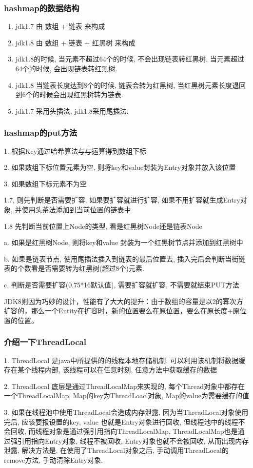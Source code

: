 \subsubsection{hashmap的数据结构}
\begin{enumerate}
	\item jdk1.7 由 数组 + 链表  来构成
	\item jdk1.8 由 数组 + 链表 + 红黑树 来构成
	\item jdk1.8的时候, 当元素不超过64个的时候, 不会出现链表转红黑树, 当元素超过64个的时候, 会出现链表转红黑树.
	\item jdk1.8 当链表长度达到8个的时候, 链表会转为红黑树, 当红黑树元素长度退回到6个的时候会出现红黑树转为链表.
	\item jdk1.7 采用头插法, jdk1.8采用尾插法.
\end{enumerate}
\subsubsection{hashmap的put方法}
1. 根据Key通过哈希算法与与运算得到数组下标 \par
2. 如果数组下标位置元素为空, 则将key和value封装为Entry对象并放入该位置 \par
3. 如果数组下标元素不为空 \par
1.7, 则先判断是否需要扩容, 如果要扩容就进行扩容, 如果不用扩容就生成Entry对象, 并使用头茶法添加到当前位置的链表中 \par
1.8 先判断当前位置上Node的类型, 看是红黑树Node还是链表Node \par
a. 如果是红黑树Node, 则将key和value 封装为一个红黑树节点并添加到红黑树中 \par
b. 如果是链表节点, 使用尾插法插入到链表的最后位置去, 插入完后会判断当街链表的个数看是否需要转为红黑树(超过8个)元素. \par
c. 判断是否需要扩容(0.75*16默认值), 需要扩容就扩容, 不需要就结束PUT方法 \par

JDK8则因为巧妙的设计，性能有了大大的提升：由于数组的容量是以2的幂次方扩容的，那么一个Entity在扩容时，新的位置要么在原位置，要么在原长度+原位置的位置。
\subsubsection{介绍一下ThreadLocal}
1. ThreadLocal 是java中所提供的的线程本地存储机制, 可以利用该机制将数据缓存在某个线程内部, 该线程可以在任意时刻, 任意方法中获取缓存的数据 \par
2. ThreadLocal 底层是通过ThreadLocalMap来实现的, 每个Thread对象中都存在一个ThreadLocalMap, Map的key为ThreadLoacl对象, Map的value为需要缓存的值 \par
3. 如果在线程池中使用ThreadLocal会造成内存泄露, 因为当ThreadLocal对象使用完后, 应该要报设置的key, value 也就是Entry对象进行回收, 但线程池中的线程不会回收, 而线程对象是通过强引用指向ThreadLocalMap, ThreadLocalMap也是通过强引用指向Entry对象, 线程不被回收, Entry对象也就不会被回收, 从而出现内存泄露, 解决方法是, 在使用了ThreadLocal对象之后, 手动调用ThreadLocal的remove方法, 手动清除Entry对象. \par

